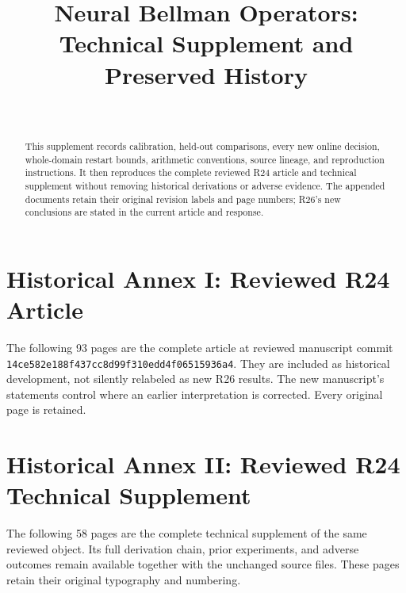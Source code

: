 
\usepackage{pdfpages}

\begin{frontmatter}
\title{Neural Bellman Operators:\\Technical Supplement and Preserved History}
\begin{aug}\author[id=au1,addressref={add1}]{~}\address[id=add1]{}\end{aug}
\begin{abstract}This supplement records calibration, held-out comparisons, every new online decision, whole-domain restart bounds, arithmetic conventions, source lineage, and reproduction instructions. It then reproduces the complete reviewed R24 article and technical supplement without removing historical derivations or adverse evidence. The appended documents retain their original revision labels and page numbers; R26's new conclusions are stated in the current article and response.\end{abstract}
\end{frontmatter}

\clearpage\section*{Historical Annex I: Reviewed R24 Article}
The following 93 pages are the complete article at reviewed manuscript commit \texttt{14ce582e188f437cc8d99f310edd4f06515936a4}. They are included as historical development, not silently relabeled as new R26 results. The new manuscript's statements control where an earlier interpretation is corrected. Every original page is retained.
\clearpage\hypersetup{pageanchor=false}
\begingroup\hoffset=0pt\voffset=0pt

\endgroup
\hypersetup{pageanchor=true}
\clearpage\section*{Historical Annex II: Reviewed R24 Technical Supplement}
The following 58 pages are the complete technical supplement of the same reviewed object. Its full derivation chain, prior experiments, and adverse outcomes remain available together with the unchanged source files. These pages retain their original typography and numbering.
\clearpage\hypersetup{pageanchor=false}
\begingroup\hoffset=0pt\voffset=0pt

\endgroup

